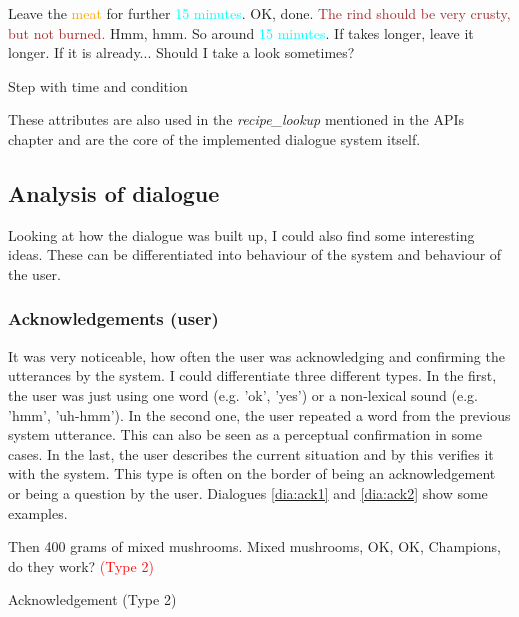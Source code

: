 \documentclass[
	11pt, %
]{fphw}
\newenvironment{captionedDialogue}
    {\captionsetup{
        type=Dialogue,
        skip=2pt,
        belowskip=13pt
        }
    }
    {}
\newenvironment{mydialogue}
    {\begin{snugshade}
     \hrulefill
     \begin{dialogue}}
    {\end{dialogue}
     \hrulefill
     \end{snugshade}}
\begin{document}
\begin{captionedDialogue}
    \begin{mydialogue}
         Leave the \textcolor{orange}{meat} for further \textcolor{cyan}{15 minutes}. 
         OK, done.
         \textcolor{brown}{The rind should be very crusty, but not burned.}
         Hmm, hmm.
         So around \textcolor{cyan}{15 minutes}. If takes longer, leave it longer. If it is already...
         Should I take a look sometimes? 
    \end{mydialogue}
    \caption{Step with time and condition}
\label{dia:step}
\end{captionedDialogue}

These attributes are also used in the \emph{recipe\_lookup} mentioned in the APIs chapter and are the core of the implemented dialogue system itself.

\subsection*{Analysis of dialogue}
Looking at how the dialogue was built up, I could also find some interesting ideas. These can be differentiated into behaviour of the system and behaviour of the user.

\subsubsection*{Acknowledgements (user)}
It was very noticeable, how often the user was acknowledging and confirming the utterances by the system. I could differentiate three different types. In the first, the user was just using one word (e.g. 'ok', 'yes') or a non-lexical sound (e.g. 'hmm', 'uh-hmm'). In the second one, the user repeated a word from the previous system utterance. This can also be seen as a perceptual confirmation in some cases. In the last, the user describes the current situation and by this verifies it with the system. This type is often on the border of being an acknowledgement or being a question by the user. Dialogues \ref{dia:ack1} and \ref{dia:ack2} show some examples.
\newpage
\begin{captionedDialogue}
    \begin{mydialogue}
         Then 400 grams of mixed mushrooms. 
         Mixed mushrooms, OK, OK, Champions, do they work? \textcolor{red}{(Type 2)}
    \end{mydialogue}
    \caption{Acknowledgement (Type 2)}
    \label{dia:ack1}
\end{captionedDialogue}
\end{document}

